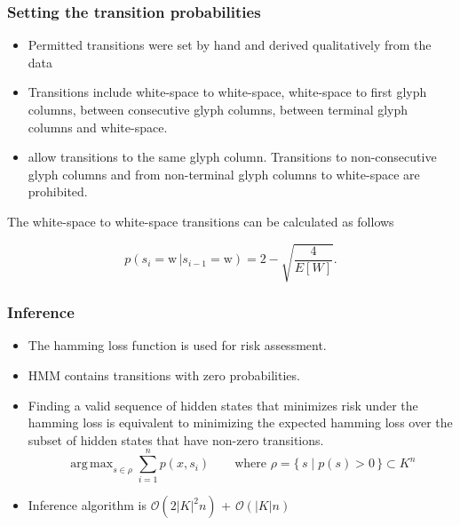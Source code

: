 \documentclass{beamer}
\DeclareMathOperator*{\argmax}{arg\,max}
\begin{document}
\begin{frame}
  \frametitle{Setting the transition probabilities}
\begin{itemize}
\item Permitted transitions were set by hand and derived qualitatively
  from the data
\item Transitions include white-space to white-space, white-space to
  first glyph columns, between consecutive glyph columns, between
  terminal glyph columns and white-space.
\item allow transitions to the same glyph column. Transitions to
  non-consecutive glyph columns and from non-terminal glyph columns to
  white-space are prohibited.
\end{itemize}

The white-space to white-space transitions can be calculated as follows

\[ 
 p(s_i=\text{w} \,|s_{i-1}=\text{w}) = 2-\sqrt{\frac{4}{E[W]}}.
\]
\end{frame}


\begin{frame}
  \frametitle{Inference}
\begin{itemize}
\item  The hamming loss function is used for risk assessment.
\item HMM contains transitions with zero probabilities. 
\item  Finding a valid sequence of hidden states that minimizes risk
under the hamming loss is equivalent to minimizing the expected
hamming loss over the subset of hidden states that have non-zero
transitions.  
\[ 
\argmax_{s \in \rho} \sum_{i=1}^n p(x,s_i) \qquad \text{where } \rho =
       \{\, s \mid p(s) > 0 \,\} \subset K^n
\]
\item Inference algorithm is $\mathcal{O}(2|K|^2n)$ + $\mathcal{O}(|K|n)$
\end{itemize}
  
\end{frame}
\end{document}

